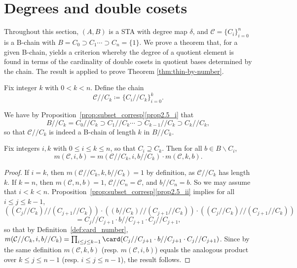  
\section{Degrees and double cosets}\label{sect3} 

Throughout this section, $(A, B)$ is a STA with degree map $\delta$, and
$\mathcal{C} = \{C_i\}_{i=0}^n$ is a B-chain with $B = C_0 \supset C_1
\cdots \supset C_n = \{1\}$. We prove a theorem that, for a given
B-chain, yields a criterion whereby the degree of a quotient element is
found in terms of the cardinality of double cosets in quotient bases
determined by the chain. The result is applied to prove Theorem
\ref{thm:thin-by-number}.

\begin{defi}
\label{def:quochain}
Fix integer $k$ with $0 < k < n$. Define the chain
\[
\mathcal{C}//C_k \coloneqq \{C_i//C_k\}_{i=0}^k.
\]
\end{defi}

\begin{rema}
\label{rem:quochain}
We have by Proposition~\ref{prop:subset_corresp}\ref{prop2.5_i} that
\[
B//C_k = C_0//C_k \supset C_1//C_k \cdots \supset C_{k-1}//C_k \supset
C_k//C_k,
\]
so that $\mathcal{C}//C_k$ is indeed a B-chain of length $k$ in
$B//C_k$.
\end{rema}

\begin{lemm}
\label{lem:chain_num_mult}
Fix integers $i, k$ with $0 \leq i \leq k \leq n$, so that $C_i
\supseteq C_k$.
Then for all $b \in B\backslash C_i$,
\[
m(\mathcal{C}, i, b) = m(\mathcal{C}//C_k, i, b//C_k)\cdot
m(\mathcal{C}, k, b).
\]
\end{lemm}
 
\begin{proof}
If $i = k$, then $m(\mathcal{C}//C_k, k, b//C_k) = 1$ by definition, as
$\mathcal{C}//C_k$ has length $k$. If $k = n$, then $m(\mathcal{C}, n,
b) = 1$, $\mathcal{C}//C_n = \mathcal{C}$, and $b//C_n = b$. So we may
assume that $i < k < n$. 
Proposition~\ref{prop:subset_corresp}\ref{prop2.5_ii} implies for all $i \leq j
\leq k-1$, 
\[
\left((C_j//C_k)//(C_{j+1}//C_k)\right) \cdot
\left((b//C_k)//(C_{j+1}//C_k)\right) \cdot
\left((C_j//C_k)//(C_{j+1}//C_k)\right)
\] 
\[
 = C_j//C_{j+1}\cdot b//C_{j+1}\cdot
C_j//C_{j+1},
\]
so that by Definition~\ref{def:card_number}, $m(\mathcal{C}//C_k, i,
b//C_k) = \prod_{i \leq j \leq k-1}\card (C_j//C_{j+1}\cdot
b//C_{j+1}\cdot C_j//C_{j+1})$. Since by the same definition $m(\mathcal{C}, k, b)$ (resp.
$m(\mathcal{C}, i, b)$) equals the analogous product over $k \leq j \leq
n-1$ (resp. $i \leq j \leq n-1$), the result follows.
\end{proof}

